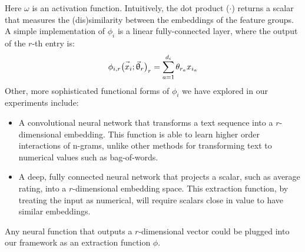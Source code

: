 \documentclass{article}
\newcommand{\vect}[1]{\vec{#1}}
\newcommand{\dotp}{\boldsymbol{\cdot} }
\begin{document}
Here $\omega$ is an activation function.
Intuitively, the dot product ($\dotp$) returns a scalar that measures the (dis)similarity between the embeddings of the feature groups.
A simple  implementation of $\phi_i$ is a linear fully-connected layer, where the output of the $r$-th entry is:
\begin{equation}
\label{eq:fully_connected}
\phi_{i,r}\bigl( \vect{x\vphantom{\theta}}_i; \vect{\uptheta}_r\bigr )_r= \sum_{a=1}^{d_i}  \theta_{r_a} x_{i_a}
\end{equation}
Other, more sophisticated functional forms of $\phi_i$ we have explored in our experiments include:
\begin{itemize}
\item A convolutional neural network that transforms a text sequence into a $r$-dimensional embedding. This function is able to learn higher order interactions of n-grams, unlike other methods for transforming text to numerical values such as bag-of-words.
\item A deep, fully connected neural network that projects a scalar, such as average rating, into a $r$-dimensional embedding space. This extraction function, by treating the input as numerical, will require scalars close in value to have similar embeddings.
\end{itemize}
Any neural function that outputs a $r$-dimensional vector could be plugged into our framework as an extraction function $\phi$.
\end{document}
